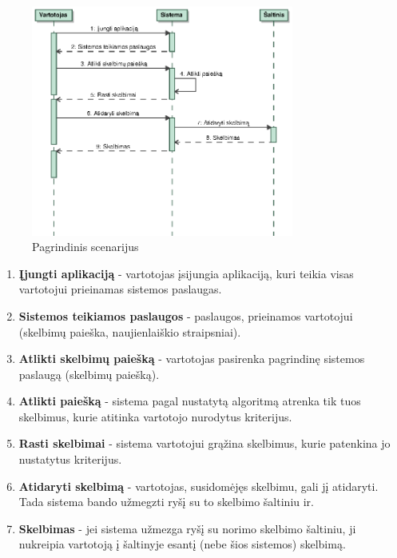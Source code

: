 \documentclass[12pt]{article}
\begin{document}
	\begin{figure}[h]
		\begin{center}
			\includegraphics[width=0.77\textwidth]{Scenarijus.eps}
			\caption{Pagrindinis scenarijus\label{Scenario}}
		\end{center}
	\end{figure}
	
	\begin{enumerate}
	\item{\textbf{Įjungti aplikaciją} - vartotojas įsijungia aplikaciją, kuri teikia visas vartotojui prieinamas sistemos paslaugas.}
	\item{\textbf{Sistemos teikiamos paslaugos} - paslaugos, prieinamos vartotojui (skelbimų paieška, naujienlaiškio straipsniai).}
	\item{\textbf{Atlikti skelbimų paiešką} - vartotojas pasirenka pagrindinę sistemos paslaugą (skelbimų paiešką).}
	\item{\textbf{Atlikti paiešką} - sistema pagal nustatytą algoritmą atrenka tik tuos skelbimus, kurie atitinka vartotojo nurodytus kriterijus.}
	\item{\textbf{Rasti skelbimai} - sistema vartotojui grąžina skelbimus, kurie patenkina jo nustatytus kriterijus.}
	\item{\textbf{Atidaryti skelbimą} - vartotojas, susidomėjęs skelbimu, gali jį  atidaryti. Tada sistema bando užmegzti ryšį su to skelbimo šaltiniu ir.}
	\item{\textbf{Skelbimas} - jei sistema užmezga ryšį su norimo skelbimo šaltiniu, ji nukreipia vartotoją į šaltinyje esantį (nebe šios sistemos) skelbimą.}
	\end{enumerate}
	
\end{document}
